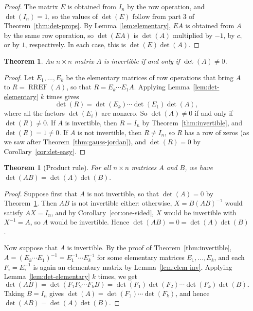 \documentclass[11pt]{article}
\theoremstyle{definition}
\theoremstyle{plain}
\newtheorem{theorem}[definition]{Theorem}
\theoremstyle{remark}
\DeclareMathOperator{\RREF}{RREF}
\begin{document}
\begin{proof}
    The matrix $E$ is obtained from $I_n$ by the row operation, and $\det(I_n) = 1$, so the values of $\det(E)$ follow from part 3 of Theorem~\ref{thm:det-props}. By Lemma~\ref{lem:elementary}, $EA$ is obtained from $A$ by the same row operation, so $\det(EA)$ is $\det(A)$ multiplied by $-1$, by $c$, or by $1$, respectively. In each case, this is $\det(E) \det(A)$.
\end{proof}

\begin{theorem}\label{thm:det-invertible}
    An $n \times n$ matrix $A$ is invertible if and only if $\det(A) \neq 0$.
\end{theorem}

\begin{proof}
    Let $E_1, \ldots, E_k$ be the elementary matrices of row operations that bring $A$ to $R = \RREF(A)$, so that $R = E_k \cdots E_1 A$. Applying Lemma~\ref{lem:det-elementary} $k$ times gives
    \[\det(R) = \det(E_k) \cdots \det(E_1) \det(A),\]
    where all the factors $\det(E_i)$ are nonzero. So $\det(A) \neq 0$ if and only if $\det(R) \neq 0$. If $A$ is invertible, then $R = I_n$ by Theorem~\ref{thm:invertible}, and $\det(R) = 1 \neq 0$. If $A$ is not invertible, then $R \neq I_n$, so $R$ has a row of zeros (as we saw after Theorem~\ref{thm:gauss-jordan}), and $\det(R) = 0$ by Corollary~\ref{cor:det-easy}.
\end{proof}

\begin{theorem}[Product rule]\label{thm:det-product}
    For all $n \times n$ matrices $A$ and $B$, we have $\det(AB) = \det(A) \det(B)$.
\end{theorem}

\begin{proof}
    Suppose first that $A$ is not invertible, so that $\det(A) = 0$ by Theorem~\ref{thm:det-invertible}. Then $AB$ is not invertible either: otherwise, $X = B(AB)^{-1}$ would satisfy $AX = I_n$, and by Corollary~\ref{cor:one-sided}, $X$ would be invertible with $X^{-1} = A$, so $A$ would be invertible. Hence $\det(AB) = 0 = \det(A) \det(B)$.

    Now suppose that $A$ is invertible. By the proof of Theorem~\ref{thm:invertible}, $A = (E_k \cdots E_1)^{-1} = E_1^{-1} \cdots E_k^{-1}$ for some elementary matrices $E_1, \ldots, E_k$, and each $F_i = E_i^{-1}$ is again an elementary matrix by Lemma~\ref{lem:elem-inv}. Applying Lemma~\ref{lem:det-elementary} $k$ times, we get
    \[\det(AB) = \det(F_1 F_2 \cdots F_k B) = \det(F_1) \det(F_2) \cdots \det(F_k) \det(B).\]
    Taking $B = I_n$ gives $\det(A) = \det(F_1) \cdots \det(F_k)$, and hence $\det(AB) = \det(A) \det(B)$.
\end{proof}
\end{document}
